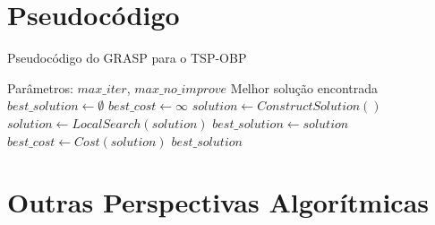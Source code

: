 \documentclass[aspectratio=169,xcolor=table]{beamer}
\begin{document}
\section{Pseudocódigo}

\begin{frame}{Pseudocódigo do GRASP para o TSP-OBP}
    \begin{algorithm}[H]
        \caption{GRASP para o TSP-OBP}
        \begin{algorithmic}
            \Require Parâmetros: $max\_iter$, $max\_no\_improve$
            \Ensure Melhor solução encontrada
            \State $best\_solution \gets \emptyset$
            \State $best\_cost \gets \infty$
                \State $solution \gets ConstructSolution()$
                \State $solution \gets LocalSearch(solution)$
                    \State $best\_solution \gets solution$
                    \State $best\_cost \gets Cost(solution)$
                \EndIf
            \EndFor
            \State \Return $best\_solution$
        \end{algorithmic}
    \end{algorithm}
\end{frame}

\section{Outras Perspectivas Algorítmicas}
\end{document}
